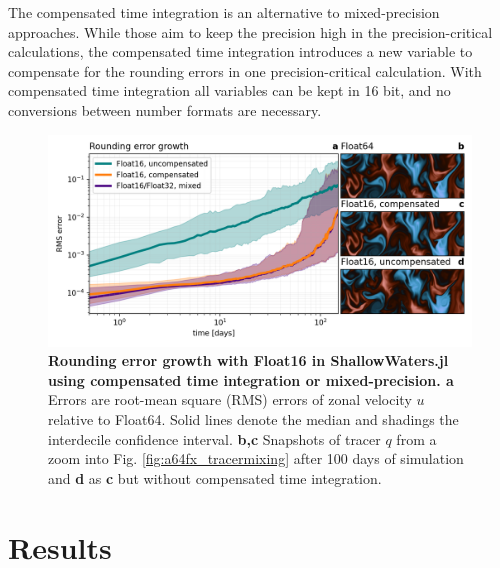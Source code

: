 The compensated time integration is an alternative to mixed-precision approaches. While those aim to keep the precision
high in the precision-critical calculations, the compensated time integration introduces a new variable to compensate for
the rounding errors in one precision-critical calculation. With compensated time integration all variables can be kept in 16 bit,
and no conversions between number formats are necessary.

\begin{figure}[tbhp]
	\includegraphics[width=1\textwidth]{Figures/a64fx/error_growth.png}
	\caption{\textbf{Rounding error growth with Float16 in ShallowWaters.jl
	using compensated time integration or mixed-precision. a}
	Errors are root-mean square (RMS) errors of zonal velocity $u$ relative to Float64. Solid lines denote the median
	and shadings the interdecile confidence interval. \textbf{b,c} Snapshots of tracer $q$ from a zoom into
	Fig. \ref{fig:a64fx_tracermixing} after 100 days of simulation and \textbf{d} as \textbf{c} but without
	compensated time integration.}
	\label{fig:a64fx_error_growth}
\end{figure}

\section{Results}
\label{sec:hardware_speedup}

